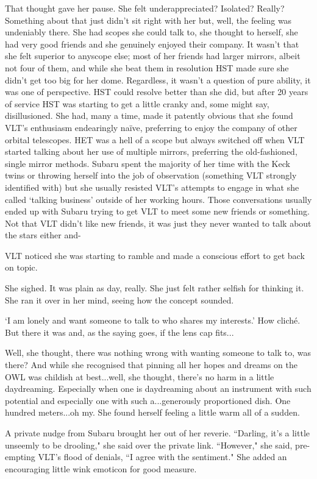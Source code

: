 \documentclass[12pt]{iopart}
\begin{document}
That thought gave her pause. She felt underappreciated? Isolated? Really? Something about that just didn't sit right with her but, well, the feeling was undeniably there. She had scopes she could talk to, she thought to herself, she had very good friends and she genuinely enjoyed their company. It wasn't that she felt superior to anyscope else; most of her friends had larger mirrors, albeit not four of them, and while she beat them in resolution HST made sure she didn't get too big for her dome. Regardless, it wasn't a question of pure ability, it was one of perspective. HST could resolve better than she did, but after 20 years of service HST was starting to get a little cranky and, some might say, disillusioned. She had, many a time, made it patently obvious that she found VLT's enthusiasm endearingly na\"{i}ve, preferring to enjoy the company of other orbital telescopes. HET was a hell of a scope but always switched off when VLT started talking about her use of multiple mirrors, preferring the old-fashioned, single mirror methods. Subaru spent the majority of her time with the Keck twins or throwing herself into the job of observation (something VLT strongly identified with) but she usually resisted VLT's attempts to engage in what she called `talking business' outside of her working hours. Those conversations usually ended up with Subaru trying to get VLT to meet some new friends or something. Not that VLT didn't like new friends, it was just they never wanted to talk about the stars either and-

VLT noticed she was starting to ramble and made a conscious effort to get back on topic.

She sighed. It was plain as day, really. She just felt rather selfish for thinking it. She ran it over in her mind, seeing how the concept sounded.

`I am lonely and want someone to talk to who shares my interests.' How clich\'{e}. But there it was and, as the saying goes, if the lens cap fits...

Well, she thought, there was nothing wrong with wanting someone to talk to, was there? And while she recognised that pinning all her hopes and dreams on the OWL was childish at best...well, she thought, there's no harm in a little daydreaming. Especially when one is daydreaming about an instrument with such potential and especially one with such a...generously proportioned dish. One hundred meters...oh my. She found herself feeling a little warm all of a sudden.

A private nudge from Subaru brought her out of her reverie. ``Darling, it's a little unseemly to be drooling," she said over the private link. ``However," she said, pre-empting VLT's flood of denials, ``I agree with the sentiment." She added an encouraging little wink emoticon for good measure.
\end{document}
